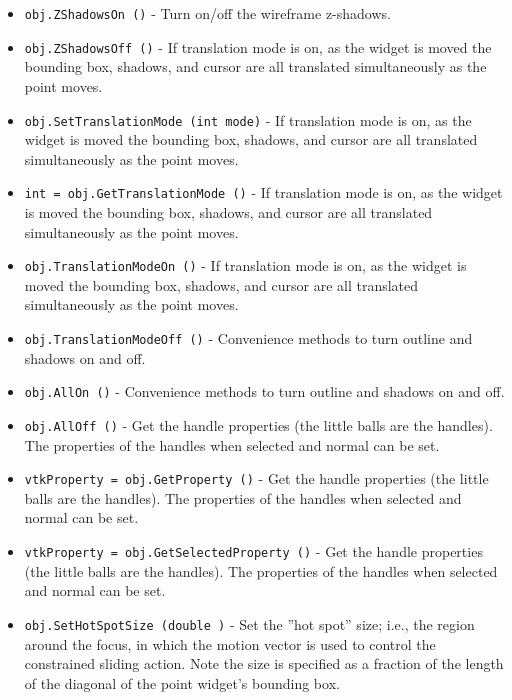 \begin{itemize}
\item  \verb|obj.ZShadowsOn ()| -  Turn on/off the wireframe z-shadows.

\item  \verb|obj.ZShadowsOff ()| -  If translation mode is on, as the widget is moved the bounding box,
 shadows, and cursor are all translated simultaneously as the point
 moves.

\item  \verb|obj.SetTranslationMode (int mode)| -  If translation mode is on, as the widget is moved the bounding box,
 shadows, and cursor are all translated simultaneously as the point
 moves.

\item  \verb|int = obj.GetTranslationMode ()| -  If translation mode is on, as the widget is moved the bounding box,
 shadows, and cursor are all translated simultaneously as the point
 moves.

\item  \verb|obj.TranslationModeOn ()| -  If translation mode is on, as the widget is moved the bounding box,
 shadows, and cursor are all translated simultaneously as the point
 moves.

\item  \verb|obj.TranslationModeOff ()| -  Convenience methods to turn outline and shadows on and off.

\item  \verb|obj.AllOn ()| -  Convenience methods to turn outline and shadows on and off.

\item  \verb|obj.AllOff ()| -  Get the handle properties (the little balls are the handles). The 
 properties of the handles when selected and normal can be 
 set.

\item  \verb|vtkProperty = obj.GetProperty ()| -  Get the handle properties (the little balls are the handles). The 
 properties of the handles when selected and normal can be 
 set.

\item  \verb|vtkProperty = obj.GetSelectedProperty ()| -  Get the handle properties (the little balls are the handles). The 
 properties of the handles when selected and normal can be 
 set.

\item  \verb|obj.SetHotSpotSize (double )| -  Set the ''hot spot'' size; i.e., the region around the focus, in which the
 motion vector is used to control the constrained sliding action. Note the
 size is specified as a fraction of the length of the diagonal of the 
 point widget's bounding box.


\end{itemize}
